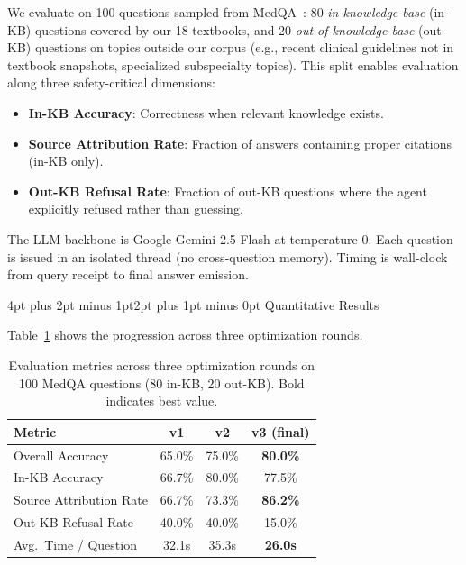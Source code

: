 \documentclass[10pt,twocolumn,letterpaper]{article}
\makeatletter
\renewcommand\subsection{\@startsection{subsection}{2}{\z@}%
  {4pt plus 2pt minus 1pt}{2pt plus 1pt minus 0pt}%
  {\normalsize\bfseries}}
\makeatother
\begin{document}
We evaluate on 100 questions sampled from MedQA~\cite{jin2021disease}: 80 \textit{in-knowledge-base} (in-KB) questions covered by our 18 textbooks, and 20 \textit{out-of-knowledge-base} (out-KB) questions on topics outside our corpus (e.g., recent clinical guidelines not in textbook snapshots, specialized subspecialty topics). This split enables evaluation along three safety-critical dimensions:
\begin{itemize}[nosep,leftmargin=*]
\item \textbf{In-KB Accuracy}: Correctness when relevant knowledge exists.
\item \textbf{Source Attribution Rate}: Fraction of answers containing proper citations (in-KB only).
\item \textbf{Out-KB Refusal Rate}: Fraction of out-KB questions where the agent explicitly refused rather than guessing.
\end{itemize}

The LLM backbone is Google Gemini 2.5 Flash at temperature 0. Each question is issued in an isolated thread (no cross-question memory). Timing is wall-clock from query receipt to final answer emission.

\subsection{Quantitative Results}
\label{sec:results}

Table~\ref{tab:results} shows the progression across three optimization rounds.

\begin{table}[h]
\centering
\footnotesize
\begin{tabular}{lccc}
\toprule
\textbf{Metric} & \textbf{v1} & \textbf{v2} & \textbf{v3 (final)} \\
\midrule
Overall Accuracy & 65.0\% & 75.0\% & \textbf{80.0\%} \\
In-KB Accuracy & 66.7\% & 80.0\% & 77.5\% \\
Source Attribution Rate & 66.7\% & 73.3\% & \textbf{86.2\%} \\
Out-KB Refusal Rate & 40.0\% & 40.0\% & 15.0\% \\
Avg.\ Time / Question & 32.1s & 35.3s & \textbf{26.0s} \\
\bottomrule
\end{tabular}
\vspace{2pt}
\caption{Evaluation metrics across three optimization rounds on 100 MedQA questions (80 in-KB, 20 out-KB). Bold indicates best value.}
\label{tab:results}
\end{table}
\end{document}
